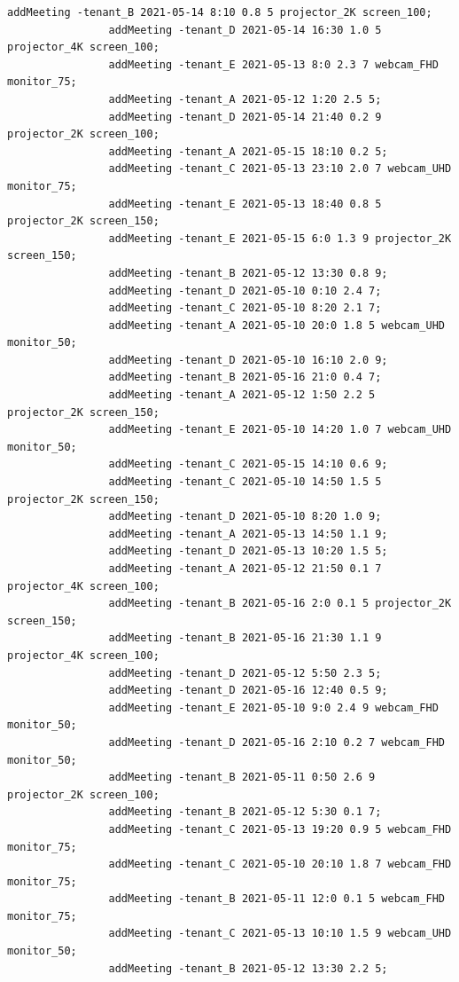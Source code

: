 \documentclass{article}
\begin{document}
\begin{Verbatim}[gobble=8]
                addMeeting -tenant_B 2021-05-14 8:10 0.8 5 projector_2K screen_100;
                addMeeting -tenant_D 2021-05-14 16:30 1.0 5 projector_4K screen_100;
                addMeeting -tenant_E 2021-05-13 8:0 2.3 7 webcam_FHD monitor_75;
                addMeeting -tenant_A 2021-05-12 1:20 2.5 5;
                addMeeting -tenant_D 2021-05-14 21:40 0.2 9 projector_2K screen_100;
                addMeeting -tenant_A 2021-05-15 18:10 0.2 5;
                addMeeting -tenant_C 2021-05-13 23:10 2.0 7 webcam_UHD monitor_75;
                addMeeting -tenant_E 2021-05-13 18:40 0.8 5 projector_2K screen_150;
                addMeeting -tenant_E 2021-05-15 6:0 1.3 9 projector_2K screen_150;
                addMeeting -tenant_B 2021-05-12 13:30 0.8 9;
                addMeeting -tenant_D 2021-05-10 0:10 2.4 7;
                addMeeting -tenant_C 2021-05-10 8:20 2.1 7;
                addMeeting -tenant_A 2021-05-10 20:0 1.8 5 webcam_UHD monitor_50;
                addMeeting -tenant_D 2021-05-10 16:10 2.0 9;
                addMeeting -tenant_B 2021-05-16 21:0 0.4 7;
                addMeeting -tenant_A 2021-05-12 1:50 2.2 5 projector_2K screen_150;
                addMeeting -tenant_E 2021-05-10 14:20 1.0 7 webcam_UHD monitor_50;
                addMeeting -tenant_C 2021-05-15 14:10 0.6 9;
                addMeeting -tenant_C 2021-05-10 14:50 1.5 5 projector_2K screen_150;
                addMeeting -tenant_D 2021-05-10 8:20 1.0 9;
                addMeeting -tenant_A 2021-05-13 14:50 1.1 9;
                addMeeting -tenant_D 2021-05-13 10:20 1.5 5;
                addMeeting -tenant_A 2021-05-12 21:50 0.1 7 projector_4K screen_100;
                addMeeting -tenant_B 2021-05-16 2:0 0.1 5 projector_2K screen_150;
                addMeeting -tenant_B 2021-05-16 21:30 1.1 9 projector_4K screen_100;
                addMeeting -tenant_D 2021-05-12 5:50 2.3 5;
                addMeeting -tenant_D 2021-05-16 12:40 0.5 9;
                addMeeting -tenant_E 2021-05-10 9:0 2.4 9 webcam_FHD monitor_50;
                addMeeting -tenant_D 2021-05-16 2:10 0.2 7 webcam_FHD monitor_50;
                addMeeting -tenant_B 2021-05-11 0:50 2.6 9 projector_2K screen_100;
                addMeeting -tenant_B 2021-05-12 5:30 0.1 7;
                addMeeting -tenant_C 2021-05-13 19:20 0.9 5 webcam_FHD monitor_75;
                addMeeting -tenant_C 2021-05-10 20:10 1.8 7 webcam_FHD monitor_75;
                addMeeting -tenant_B 2021-05-11 12:0 0.1 5 webcam_FHD monitor_75;
                addMeeting -tenant_C 2021-05-13 10:10 1.5 9 webcam_UHD monitor_50;
                addMeeting -tenant_B 2021-05-12 13:30 2.2 5;
            \end{Verbatim}
\end{document}
